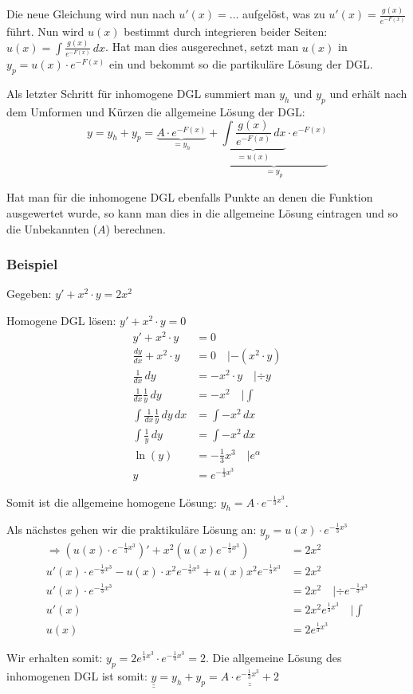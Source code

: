 Die neue Gleichung wird nun nach $u'(x) = \ldots$ aufgelöst, was zu
$u'(x) = \frac{g(x)}{e^{-F(x)}}$ führt. Nun wird $u(x)$ bestimmt durch integrieren
beider Seiten: $u(x) = \int \frac{g(x)}{e^{-F(x)}}\,dx$. Hat man dies ausgerechnet,
setzt man $u(x)$ in $y_p = u(x) \cdot e^{-F(x)}$ ein und bekommt so die partikuläre
Lösung der DGL.

Als letzter Schritt für inhomogene DGL summiert man $y_h$ und $y_p$ und erhält nach
dem Umformen und Kürzen die allgemeine Lösung der DGL:
{\small
\[
y = y_h + y_p = 
\underbrace{A \cdot e^{-F(x)}}_{= y_h} +
\underbrace{\underbrace{\int \frac{g(x)}{e^{-F(x)}}\,dx}_{= u(x)} \cdot e^{-F(x)}}_{= y_p}
\]
}

Hat man für die inhomogene DGL ebenfalls Punkte an denen die Funktion ausgewertet wurde,
so kann man dies in die allgemeine Lösung eintragen und so die Unbekannten ($A$) berechnen.

\subsubsection{Beispiel}
Gegeben: $y' + x^2 \cdot y = 2x^2$

Homogene DGL lösen: $y' + x^2 \cdot y = 0$
\begin{align*}
y' + x^2 \cdot y &= 0\\
\frac{dy}{dx} + x^2 \cdot y &= 0 \quad | -(x^2 \cdot y)\\
\frac{1}{dx}\, dy &= -x^2 \cdot y \quad | \div y\\
\frac{1}{dx} \frac{1}{y} \, dy &= -x^2 \quad | \int\\
\int \frac{1}{dx} \frac{1}{y} \, dy \, dx &= \int -x^2 \, dx\\
\int \frac{1}{y}\, dy &= \int -x^2 \, dx\\
\ln(y) &= -\frac{1}{3} x^3 \quad | e^\alpha\\
y &= e^{-\frac{1}{3}x^3}
\end{align*}

Somit ist die allgemeine homogene Lösung: $y_h = A \cdot e^{-\frac{1}{3}x^3}$.


Als nächstes gehen wir die praktikuläre Lösung an:
$y_p = u(x) \cdot e^{-\frac{1}{3}x^3}$
\begin{align*}
\Rightarrow (u(x) \cdot e^{-\frac{1}{3}x^3})' + x^2 (u(x) e^{-\frac{1}{3}x^3}) &= 2 x^2\\
u'(x) \cdot e^{-\frac{1}{3}x^3} - u(x) \cdot x^2 e^{-\frac{1}{3}x^3} + u(x) x^2 e^{-\frac{1}{3}x^3} &= 2 x^2\\
u'(x) \cdot e^{-\frac{1}{3}x^3} &= 2 x^2 \quad | \div e^{-\frac{1}{3}x^3}\\
u'(x) &= 2 x^2 e^{\frac{1}{3}x^3} \quad | \int\\
u(x) &= 2 e^{\frac{1}{3}x^3}
\end{align*}

Wir erhalten somit: $y_p = 2 e^{\frac{1}{3}x^3} \cdot e^{-\frac{1}{3}x^3} = 2$.
Die allgemeine Lösung des inhomogenen DGL ist somit:
$\underline{\underline{y}} = y_h + y_p = \underline{\underline{A \cdot e^{-\frac{1}{3}x^3} + 2}}$